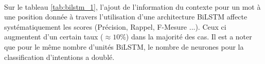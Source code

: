 	\paragraph{}
	Sur le tableau \ref{tab:bilstm_1}, l'ajout de l'information du contexte pour un mot à une position donnée à travers l'utilisation d'une architecture BiLSTM affecte systématiquement les scores (Précision, Rappel, F-Mesure ...). Ceux ci augmentent d'un certain taux ($\approx 10\%$) dans la majorité des cas. Il est a noter que pour le même nombre d'unités BiLSTM, le nombre de neurones pour la classification d'intentions a doublé.
	
	
	
	\begin{table}[H]
		\centering
\end{table}

